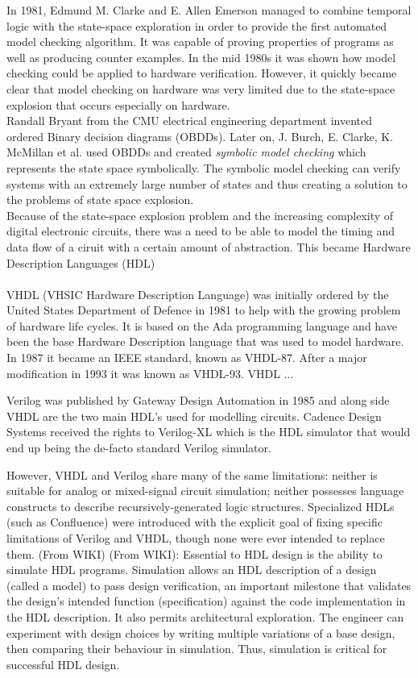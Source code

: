 In 1981, Edmund M. Clarke and E. Allen Emerson managed to combine temporal logic with the state-space exploration in order to provide the first automated model checking algorithm\cite{Clarke1981}. It was capable of proving properties of programs as well as producing counter examples.
In the mid 1980s it was shown how model checking could be applied to hardware verification. However, it quickly became clear that model checking on hardware was very limited due to the state-space explosion that occurs especially on hardware. \\
Randall Bryant from the CMU electrical engineering department invented ordered Binary decision diagrams (OBDDs). Later on, J. Burch, E. Clarke, K. McMillan et al.\cite{Burch1992} used OBDDs and created \textit{symbolic model checking} which represents the state space symbolically. The symbolic model checking can verify systems with an extremely large number of states and thus creating a solution to the problems of state space explosion.\\
Because of the state-space explosion problem and the increasing complexity of digital electronic circuits, there was a need to be able to model the timing and data flow of a ciruit with a certain amount of abstraction. This became Hardware Description Languages (HDL) \\\\
VHDL (VHSIC Hardware Description Language) was initially ordered by the United States Department of Defence in 1981 to help with the growing problem of hardware life cycles. It is based on the Ada programming language and have been the base Hardware Description language that was used to model hardware. In 1987 it became an IEEE standard, known as VHDL-87. After a major modification in 1993 it was known as VHDL-93. VHDL ... 

Verilog was published by Gateway Design Automation in 1985 and along side VHDL are the two main HDL's used for modelling circuits. Cadence Design Systems received the rights to Verilog-XL which is the HDL simulator that would end up being the de-facto standard Verilog simulator.



However, VHDL and Verilog share many of the same limitations: neither is suitable for analog or mixed-signal circuit simulation; neither possesses language constructs to describe recursively-generated logic structures. Specialized HDLs (such as Confluence) were introduced with the explicit goal of fixing specific limitations of Verilog and VHDL, though none were ever intended to replace them. (From WIKI)
(From WIKI): Essential to HDL design is the ability to simulate HDL programs. Simulation allows an HDL description of a design (called a model) to pass design verification, an important milestone that validates the design's intended function (specification) against the code implementation in the HDL description. It also permits architectural exploration. The engineer can experiment with design choices by writing multiple variations of a base design, then comparing their behaviour in simulation. Thus, simulation is critical for successful HDL design.


